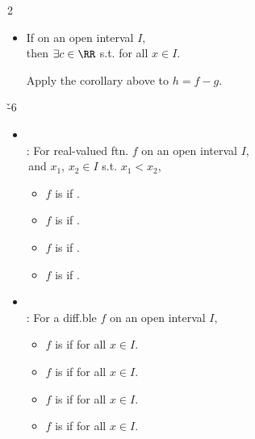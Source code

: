 \documentclass[dvipdfmx,a4paper,titlepage,9pt]{jsarticle}
\begin{document}
\begin{multicols*}{2}
\begin{itemize}[label={-}]
\begin{Pfbox}
Thus $f(x_1)=f(x_2)$.
\end{Pfbox}\;

\item If  on an open interval $I$,\\
then $\exists c\in\RR$ s.t.  for all $x\in I$.

\begin{Pfbox}
Apply the corollary above to $h=f-g$.
\end{Pfbox}
\end{itemize}

\newpage

\v{-6}
\begin{itemize}[label={-}]
\item{}\\
: For real-valued ftn. $f$ on an open interval $I$,\\
\;\;\,and $x_1$, $x_2\in I$ s.t. $x_1<x_2$,
\begin{itemize}[label=\Cdot]
\setlength{\leftskip}{-10pt}
\item $f$ is  if .
\item $f$ is  if .
\item $f$ is  if .
\item $f$ is  if .\\
\end{itemize}

\item{}\\
: For a diff.ble $f$ on an open interval $I$,
\begin{itemize}[label=\Cdot]
\setlength{\leftskip}{-10pt}
\item $f$ is  \hfill if  for all $x\in I$.\qquad\phantom{.}
\item $f$ is  \hfill if  for all $x\in I$.\qquad\phantom{.}
\item $f$ is  \hfill if  for all $x\in I$.\qquad\phantom{.}
\item $f$ is  \hfill if  for all $x\in I$.\qquad\phantom{.}\\
\end{itemize}
\end{itemize}


\end{multicols*}
\end{document}
